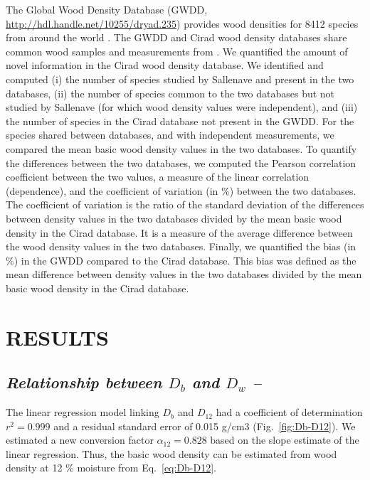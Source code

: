 \documentclass[a4paper, 12pt, leqno, dvipsnames]{article}\usepackage[]{graphicx}\usepackage[]{color}
\begin{document}
The Global Wood Density Database (GWDD, \url{http://hdl.handle.net/10255/dryad.235}) provides wood densities for 8412 species from around the world \citep{Chave2009, Zanne2009}. The GWDD and Cirad wood density databases share common wood samples and measurements from \citet{Sallenave1955, Sallenave1964, Sallenave1971}. We quantified the amount of novel information in the Cirad wood density database. We identified and computed (i) the number of species studied by Sallenave and present in the two databases, (ii) the number of species common to the two databases but not studied by Sallenave (for which wood density values were independent), and (iii) the number of species in the Cirad database not present in the GWDD. For the species shared between databases, and with independent measurements, we compared the mean basic wood density values in the two databases. To quantify the differences between the two databases, we computed the Pearson correlation coefficient between the two values, a measure of the linear correlation (dependence), and the coefficient of variation (in \%) between the two databases. The coefficient of variation is the ratio of the standard deviation of the differences between density values in the two databases divided by the mean basic wood density in the Cirad database. It is a measure of the average difference between the wood density values in the two databases. Finally, we quantified the bias (in \%) in the GWDD compared to the Cirad database. This bias was defined as the mean difference between density values in the two databases divided by the mean basic wood density in the Cirad database. 

\newpage

\section*{RESULTS}

\subsection*{\textit{Relationship between $D_b$ and $D_w$ --}}

The linear regression model linking $D_b$ and $D_{12}$ had a coefficient of determination $r^2=0.999$ and a residual standard error of 0.015 g/cm$3$ (Fig.~\ref{fig:Db-D12}). We estimated a new conversion factor $\alpha_{12}=0.828$ based on the slope estimate of the linear regression. Thus, the basic wood density can be estimated from wood density at 12 \% moisture from Eq.~\ref{eq:Db-D12}.
\end{document}
